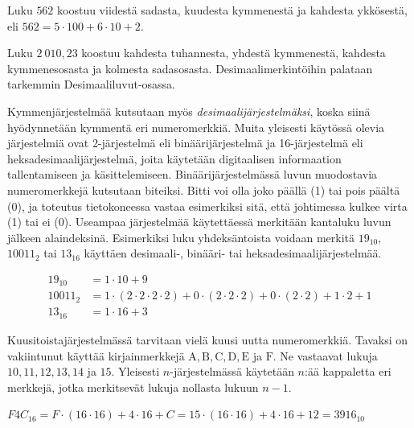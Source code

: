 \begin{esimerkki}
Luku $562$ koostuu viidestä sadasta, kuudesta kymmenestä ja kahdesta ykkösestä, eli $562= 5 \cdot 100 + 6 \cdot 10 + 2$.

Luku $2~010,23$ koostuu kahdesta tuhannesta, yhdestä kymmenestä, kahdesta kymmenesosasta ja kolmesta sadasosasta. Desimaalimerkintöihin palataan tarkemmin Desimaaliluvut-osassa.
\end{esimerkki}



Kymmenjärjestelmää kutsutaan myös \emph{desimaalijärjestelmäksi}, koska siinä hyödynnetään kymmentä eri numeromerkkiä. Muita yleisesti käytössä olevia järjestelmiä ovat 2-järjestelmä eli binäärijärjestelmä ja 16-järjestelmä eli heksadesimaalijärjestelmä, joita käytetään digitaalisen informaation tallentamiseen ja käsittelemiseen. Binäärijärjestelmässä luvun muodostavia numeromerkkejä kutsutaan biteiksi. Bitti voi olla joko päällä (1) tai pois päältä (0), ja toteutus tietokoneessa vastaa esimerkiksi sitä, että johtimessa kulkee virta (1) tai ei (0). Useampaa järjestelmää käytettäessä merkitään kantaluku luvun jälkeen alaindeksinä. Esimerkiksi luku yhdeksäntoista voidaan merkitä $19_{10}$, $10011_{2}$ tai $13_{16}$ käyttäen desimaali-, binääri- tai heksadesimaalijärjestelmää.

\begin{esimerkki}
\begin{align*}
19_{10} &= 1 \cdot 10 + 9 \\
10011_{2} &= 1 \cdot (2 \cdot 2 \cdot 2 \cdot 2) + 0 \cdot (2 \cdot 2 \cdot 2) + 0 \cdot (2 \cdot 2) + 1 \cdot 2 + 1 \\
13_{16} &= 1 \cdot 16 + 3
\end{align*}
\end{esimerkki}

Kuusitoistajärjestelmässä tarvitaan vielä kuusi uutta numeromerkkiä. Tavaksi on vakiintunut käyttää kirjainmerkkejä $\mathrm{A, B, C, D, E}$ ja $\mathrm{F}$. Ne vastaavat lukuja $10, 11, 12, 13, 14$ ja $15$. Yleisesti $n$-järjestelmässä käytetään $n$:ää kappaletta eri merkkejä, jotka merkitsevät lukuja nollasta lukuun $n-1$.

\begin{esimerkki}
$F4C_{16} = F \cdot (16 \cdot 16) + 4 \cdot 16 + C = 15 \cdot (16 \cdot 16) + 4 \cdot 16 + 12 = 3916_{10}$
\end{esimerkki}


